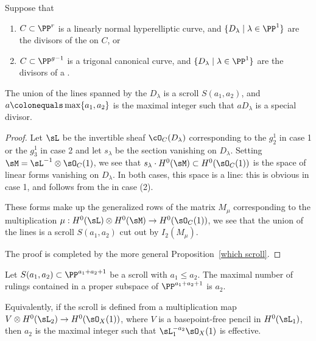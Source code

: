 \begin{corollary}\label{hyperelliptic and trigonal} Suppose that 
\begin{enumerate}
\item  $C\subset \PP^r$ is a linearly normal hyperelliptic curve, and
%
$
\{D_\lambda \mid \lambda \in \PP^1\}
$
are the divisors of the 
%
on $C$, or

\item $C\subset \PP^{g-1}$ is a trigonal canonical curve, and
$\{D_\lambda \mid \lambda \in \PP^1\}$
are the divisors of a
%
.
\end{enumerate}
%
The union of the lines spanned by the $D_\lambda$
is a scroll $S(a_1,a_2)$, and $a\colonequals  \max\{a_1, a_2\}$ is the
maximal integer such that
$aD_\lambda$ is a special divisor.
\end{corollary}

\begin{proof}
Let $\sL$ be the invertible sheaf $\cO_C(D_\lambda)$ corresponding to
the $g^1_2$ in case 1 or
the $g_3^1$ in case 2 and let $s_\lambda$ be
the section vanishing on $D_\lambda$. Setting $\sM =  \sL^{-1}\otimes
\sO_C(1)$, we see that
$s_\lambda\cdot H^0(\sM) \subset H^0(\sO_C(1))$ is the space of linear
forms vanishing on
$D_\lambda$. In both cases, this space is a line: this is obvious in
case 1, and follows from the
%
 in case (2).

These forms make up the
generalized rows of the matrix $M_\mu$ corresponding to the multiplication
$\mu: H^0(\sL)\otimes H^0(\sM) \to H^0(\sO_C(	1))$, we see that the
union of the lines is a
scroll $S(a_1,a_2)$ cut out by $I_2(M_\mu)$.

The proof is completed by the more general Proposition~\ref{which scroll}.
\end{proof}

\begin{proposition}\label{which scroll}
Let $S(a_1,a_2)\subset \PP^{a_1+a_2+1}$ be a scroll with $a_1\leq
a_2$. The maximal number of rulings contained in
a proper subspace of $ \PP^{a_1+a_2+1}$ is $a_2$.

Equivalently, if the scroll is defined from a multiplication
map $V\otimes H^0(\sL_2) \to H^0(\sO_X(1))$, where $V$ is a basepoint-free
pencil in $H^0(\sL_1)$,
then $a_2$ is the maximal integer such that $\sL_1^{-a_2}\sO_X(1)$
is effective.
\unif
\end{proposition}

